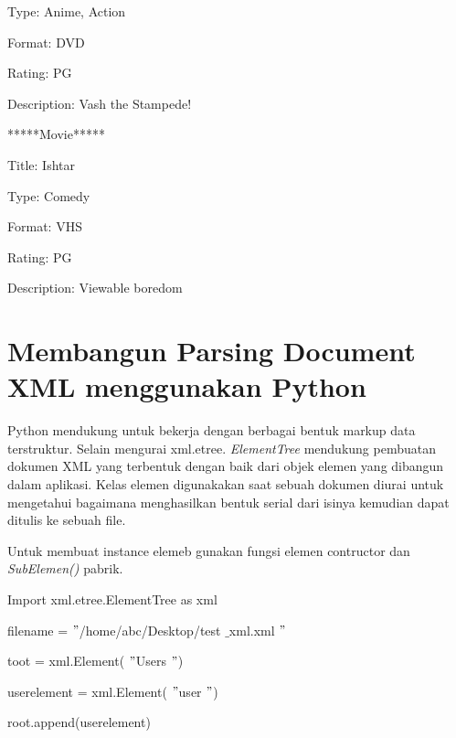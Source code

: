 \documentclass{wileySix}
\begin{document}
\begin{myEnumerate}
{\noindent 
Type: Anime, Action \par
\noindent 
Format: DVD \par
\noindent 
Rating: PG \par
\noindent 
Description: Vash the Stampede! \par
\noindent 
*****Movie***** \par
\noindent 
Title: Ishtar \par
\noindent 
Type: Comedy \par
\noindent 
Format: VHS \par
\noindent 
Rating: PG \par
\noindent 
Description: Viewable boredom \par
\vspace{12pt}
\noindent

\section{Membangun Parsing Document XML menggunakan Python}
\par
\noindent 
\hspace*{0.5in} Python mendukung untuk bekerja dengan berbagai bentuk markup data terstruktur. Selain mengurai xml.etree. \textit{ElementTree} mendukung pembuatan dokumen XML yang terbentuk dengan baik dari objek elemen yang dibangun dalam aplikasi. Kelas elemen digunakakan saat sebuah dokumen diurai untuk mengetahui bagaimana menghasilkan bentuk serial dari isinya kemudian dapat ditulis ke sebuah file.  \par
\vspace{12pt}
\noindent 
\hspace*{0.5in} Untuk membuat instance elemeb gunakan fungsi elemen contructor dan \textit{SubElemen()} pabrik. \par
\noindent 
Import xml.etree.ElementTree as xml \par
\vspace{12pt}
\noindent 
{\fontsize{10pt}{10pt}\selectfont filename =  $ " $/home/abc/Desktop/test $  \_  $xml.xml $ " $} \par
\noindent 
{\fontsize{10pt}{10pt}\selectfont toot = xml.Element( $ " $Users $ " $)} \par
\noindent 
{\fontsize{10pt}{10pt}\selectfont userelement = xml.Element( $ " $user $ " $)} \par
\noindent 
{\fontsize{10pt}{10pt}\selectfont root.append(userelement)} \par
\noindent 
\vspace{10pt}
}
\end{myEnumerate}
\end{document}
